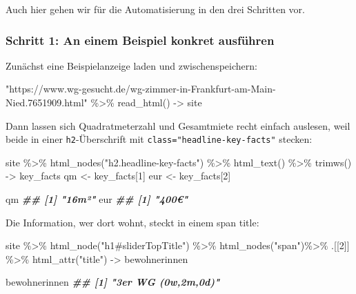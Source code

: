\documentclass[
  ngerman,
]{article}
\newenvironment{Shaded}{\begin{snugshade}}{\end{snugshade}}
\newcommand{\DecValTok}[1]{\textcolor[rgb]{0.00,0.00,0.81}{#1}}
\newcommand{\DocumentationTok}[1]{\textcolor[rgb]{0.56,0.35,0.01}{\textbf{\textit{#1}}}}
\newcommand{\FunctionTok}[1]{\textcolor[rgb]{0.00,0.00,0.00}{#1}}
\newcommand{\NormalTok}[1]{#1}
\newcommand{\OtherTok}[1]{\textcolor[rgb]{0.56,0.35,0.01}{#1}}
\newcommand{\SpecialCharTok}[1]{\textcolor[rgb]{0.00,0.00,0.00}{#1}}
\newcommand{\StringTok}[1]{\textcolor[rgb]{0.31,0.60,0.02}{#1}}
\begin{document}
Auch hier gehen wir für die Automatisierung in den drei Schritten vor.

\hypertarget{schritt-1-an-einem-beispiel-konkret-ausfuxfchren-1}{%
\subsubsection{Schritt 1: An einem Beispiel konkret ausführen}\label{schritt-1-an-einem-beispiel-konkret-ausfuxfchren-1}}

Zunächst eine Beispielanzeige laden und zwischenspeichern:

\begin{Shaded}
\begin{Highlighting}[]
\StringTok{"https://www.wg{-}gesucht.de/wg{-}zimmer{-}in{-}Frankfurt{-}am{-}Main{-}Nied.7651909.html"} \SpecialCharTok{\%\textgreater{}\%}
  \FunctionTok{read\_html}\NormalTok{() }\OtherTok{{-}\textgreater{}}\NormalTok{ site}
\end{Highlighting}
\end{Shaded}

Dann lassen sich Quadratmeterzahl und Gesamtmiete recht einfach auslesen, weil beide in einer \texttt{h2}-Überschrift mit \texttt{class="headline-key-facts"} stecken:

\begin{Shaded}
\begin{Highlighting}[]
\NormalTok{site }\SpecialCharTok{\%\textgreater{}\%}
  \FunctionTok{html\_nodes}\NormalTok{(}\StringTok{"h2.headline{-}key{-}facts"}\NormalTok{) }\SpecialCharTok{\%\textgreater{}\%}
  \FunctionTok{html\_text}\NormalTok{() }\SpecialCharTok{\%\textgreater{}\%}
  \FunctionTok{trimws}\NormalTok{() }\OtherTok{{-}\textgreater{}}\NormalTok{ key\_facts}
\NormalTok{  qm }\OtherTok{\textless{}{-}}\NormalTok{ key\_facts[}\DecValTok{1}\NormalTok{]}
\NormalTok{  eur }\OtherTok{\textless{}{-}}\NormalTok{ key\_facts[}\DecValTok{2}\NormalTok{]}

\NormalTok{qm}
\DocumentationTok{\#\# [1] "16m²"}
\NormalTok{eur}
\DocumentationTok{\#\# [1] "400€"}
\end{Highlighting}
\end{Shaded}

Die Information, wer dort wohnt, steckt in einem span title:

\begin{Shaded}
\begin{Highlighting}[]
\NormalTok{site }\SpecialCharTok{\%\textgreater{}\%}
  \FunctionTok{html\_node}\NormalTok{(}\StringTok{"h1\#sliderTopTitle"}\NormalTok{) }\SpecialCharTok{\%\textgreater{}\%}
  \FunctionTok{html\_nodes}\NormalTok{(}\StringTok{"span"}\NormalTok{)}\SpecialCharTok{\%\textgreater{}\%}
\NormalTok{  .[[}\DecValTok{2}\NormalTok{]] }\SpecialCharTok{\%\textgreater{}\%}
  \FunctionTok{html\_attr}\NormalTok{(}\StringTok{"title"}\NormalTok{) }\OtherTok{{-}\textgreater{}}\NormalTok{ bewohnerinnen}

\NormalTok{bewohnerinnen}
\DocumentationTok{\#\# [1] "3er WG (0w,2m,0d)"}
\end{Highlighting}
\end{Shaded}
\end{document}
